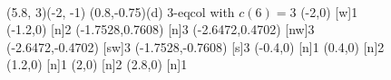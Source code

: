 \begin{figure}[h]
\begin{graph}
\end{graph}~~~~~~~~~~~
\begin{graph}(5.8, 3)(-2, -1)
	\freetext(0.8,-0.75){(d) 3-eqcol with $c(6)=3$}
	(-2,0)
	{1}
	(-1.2,0)
	{2}
	(-1.7528,0.7608)
	{3}
	(-2.6472,0.4702)
	[nw]{3}
	(-2.6472,-0.4702)
	[sw]{3}
	(-1.7528,-0.7608)
	{3}
	(-0.4,0)
	{1}
	(0.4,0)
	{2}
	(1.2,0)
	{1}
	(2,0)
	{2}
	(2.8,0)
	{1}
\end{graph}
  \caption{}
  \label{minigraph2}
\end{figure}

